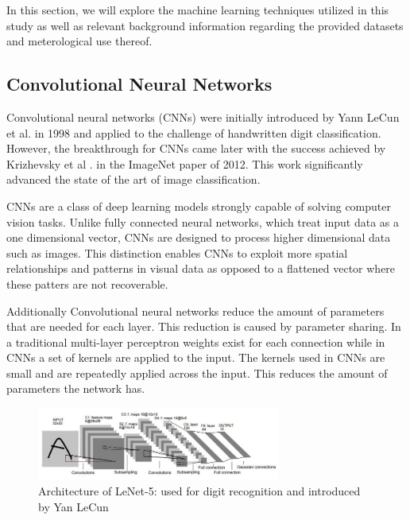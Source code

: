 In this section, we will explore the machine learning techniques utilized
in this study as well as relevant background information regarding the
provided datasets and meterological use thereof.
\medskip

\subsection{Convolutional Neural Networks}

Convolutional neural networks (CNNs) were initially introduced by Yann LeCun et al. in 1998 \cite{lecun-1998} and applied to the challenge of handwritten digit classification. However, the breakthrough for CNNs came later with the success achieved by Krizhevsky et al \cite{krizhevsky-2017}. in the ImageNet paper of 2012.
This work significantly advanced the state of the art of image classification.
\medskip

CNNs are a class of deep learning models strongly capable of solving computer vision tasks. Unlike fully connected neural networks, which treat input data as a one dimensional vector, CNNs are designed to process higher dimensional data such as images.
This distinction enables CNNs to exploit more spatial relationships and patterns in visual data as opposed to a flattened vector where these patters are not recoverable.
\medskip

Additionally Convolutional neural networks reduce the amount of parameters that are needed for each layer. This reduction is caused by parameter sharing.
In a traditional multi-layer perceptron weights exist for each connection while in CNNs a set of kernels are applied to the input. The kernels used in CNNs are small and are repeatedly applied across the input.
This reduces the amount of parameters the network has. 

\begin{figure}
  \includegraphics[width=8cm]{../images/cun.jpeg}
  \caption[short]{Architecture of LeNet-5: used for digit recognition and introduced by Yan LeCun \cite{lecun-1998}}
\end{figure}

